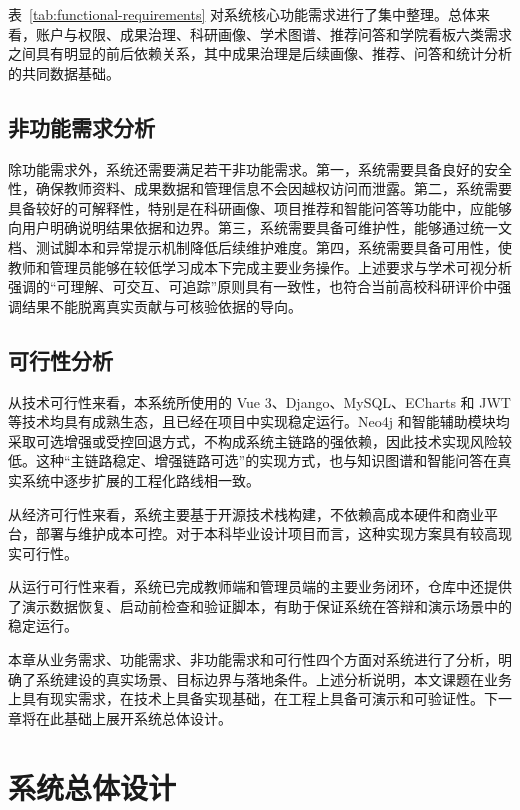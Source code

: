 \documentclass[12pt,a4paper]{ctexbook}
\begin{document}
表~\ref{tab:functional-requirements} 对系统核心功能需求进行了集中整理。总体来看，账户与权限、成果治理、科研画像、学术图谱、推荐问答和学院看板六类需求之间具有明显的前后依赖关系，其中成果治理是后续画像、推荐、问答和统计分析的共同数据基础。

\section{非功能需求分析}
除功能需求外，系统还需要满足若干非功能需求。第一，系统需要具备良好的安全性，确保教师资料、成果数据和管理信息不会因越权访问而泄露。第二，系统需要具备较好的可解释性，特别是在科研画像、项目推荐和智能问答等功能中，应能够向用户明确说明结果依据和边界。第三，系统需要具备可维护性，能够通过统一文档、测试脚本和异常提示机制降低后续维护难度。第四，系统需要具备可用性，使教师和管理员能够在较低学习成本下完成主要业务操作。上述要求与学术可视分析强调的“可理解、可交互、可追踪”原则具有一致性\cite{visual_analytics_2008}，也符合当前高校科研评价中强调结果不能脱离真实贡献与可核验依据的导向\cite{sci_policy_2020}。

\section{可行性分析}
从技术可行性来看，本系统所使用的 Vue 3、Django、MySQL、ECharts 和 JWT 等技术均具有成熟生态，且已经在项目中实现稳定运行。Neo4j 和智能辅助模块均采取可选增强或受控回退方式，不构成系统主链路的强依赖，因此技术实现风险较低。这种“主链路稳定、增强链路可选”的实现方式，也与知识图谱和智能问答在真实系统中逐步扩展的工程化路线相一致\cite{kg_survey_foreign_2021}\cite{qa_system_survey_2023}。

从经济可行性来看，系统主要基于开源技术栈构建，不依赖高成本硬件和商业平台，部署与维护成本可控。对于本科毕业设计项目而言，这种实现方案具有较高现实可行性。

从运行可行性来看，系统已完成教师端和管理员端的主要业务闭环，仓库中还提供了演示数据恢复、启动前检查和验证脚本，有助于保证系统在答辩和演示场景中的稳定运行。

本章从业务需求、功能需求、非功能需求和可行性四个方面对系统进行了分析，明确了系统建设的真实场景、目标边界与落地条件。上述分析说明，本文课题在业务上具有现实需求，在技术上具备实现基础，在工程上具备可演示和可验证性。下一章将在此基础上展开系统总体设计。

\chapter{系统总体设计}
\end{document}
